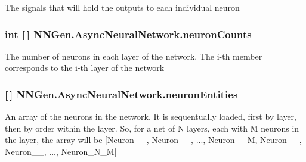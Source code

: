 The signals that will hold the outputs to each individual neuron 

\hypertarget{class_n_n_gen_1_1_async_neural_network_aec2195cbfa8c8f568dc512ab511d06c0}{}
\subsubsection[{neuron\+Counts}]{\setlength{\rightskip}{0pt plus 5cm}int \mbox{[}$\,$\mbox{]} N\+N\+Gen.\+Async\+Neural\+Network.\+neuron\+Counts\hspace{0.3cm}{\ttfamily [get]}}\label{class_n_n_gen_1_1_async_neural_network_aec2195cbfa8c8f568dc512ab511d06c0}


The number of neurons in each layer of the network. The i-\/th member corresponds to the i-\/th layer of the network 

\hypertarget{class_n_n_gen_1_1_async_neural_network_aeaec2eb4cfb3a7dba9c40d04c2fe7fb1}{}
\subsubsection[{neuron\+Entities}]{ \mbox{[}$\,$\mbox{]} N\+N\+Gen.\+Async\+Neural\+Network.\+neuron\+Entities\hspace{0.3cm}{\ttfamily [get]}}\label{class_n_n_gen_1_1_async_neural_network_aeaec2eb4cfb3a7dba9c40d04c2fe7fb1}


An array of the neurons in the network. It is sequentually loaded, first by layer, then by order within the layer. So, for a net of N layers, each with M neurons in the layer, the array will be \mbox{[}Neuron\+\_\+\_, Neuron\+\_\+\_, ..., Neuron\+\_\+\_\+\+M, Neuron\+\_\+\_, Neuron\+\_\+\_, ..., Neuron\+\_\+\+N\+\_\+\+M\mbox{]} 

\hypertarget{class_n_n_gen_1_1_async_neural_network_a6422fde806a9cf2188ca93c5166ebb23}{}
